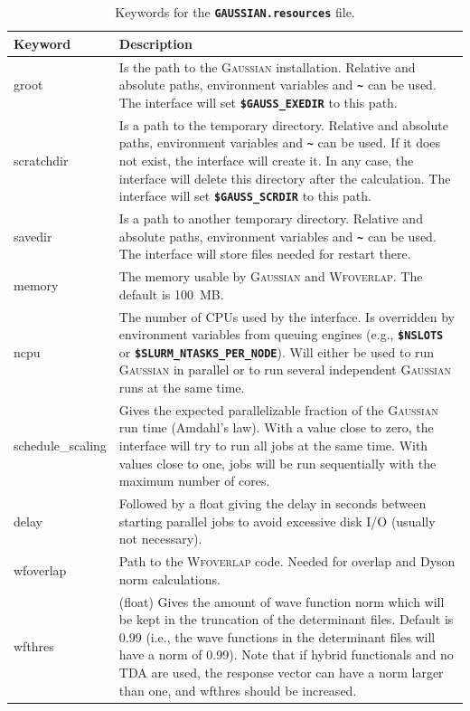 \documentclass[a4paper,10pt,DIV=15,openany,twoside=false]{scrbook}
\newcommand{\ttt}[1]{\textbf{\texttt{#1}}}
\begin{document}
\begin{table}
  \centering
  \caption{Keywords for the \ttt{GAUSSIAN.resources} file.}
  \label{tab:adf_sh2}
  \begin{tabular}{>{\ttfamily}lp{12cm}}
  \toprule
  Keyword       &Description\\
  \midrule
groot                   &Is the path to the \textsc{Gaussian} installation. Relative and absolute paths, environment variables and \ttt{\textasciitilde} can be used. The interface will set \ttt{\$GAUSS\_EXEDIR} to this path.
\\
scratchdir              &Is a path to the temporary directory. Relative and absolute paths, environment variables and \ttt{\textasciitilde} can be used. If it does not exist, the interface will create it. In any case, the interface will delete this directory after the calculation. The interface will set \ttt{\$GAUSS\_SCRDIR} to this path.
\\
savedir                 &Is a path to another temporary directory.  Relative and absolute paths, environment variables and \ttt{\textasciitilde} can be used. The interface will store files needed for restart there.
\\
memory                  &The memory usable by \textsc{Gaussian} and \textsc{Wfoverlap}. The default is 100~MB. 
\\
ncpu                    &The number of CPUs used by the interface. Is overridden by environment variables from queuing engines (e.g., \ttt{\$NSLOTS} or \ttt{\$SLURM\_NTASKS\_PER\_NODE}). Will either be used to run \textsc{Gaussian} in parallel or to run several independent \textsc{Gaussian} runs at the same time.
\\
schedule\_scaling       &Gives the expected parallelizable fraction of the \textsc{Gaussian} run time (Amdahl's law). With a value close to zero, the interface will try to run all jobs at the same time. With values close to one, jobs will be run sequentially with the maximum number of cores.
\\
delay                   &Followed by a float giving the delay in seconds between starting parallel jobs to avoid excessive disk I/O (usually not necessary).
\\
wfoverlap               &Path to the \textsc{Wfoverlap} code. Needed for overlap and Dyson norm calculations.
\\
wfthres                 &(float) Gives the amount of wave function norm which will be kept in the truncation of the determinant files. Default is 0.99 (i.e., the wave functions in the determinant files will have a norm of 0.99). Note that if hybrid functionals and no TDA are used, the response vector can have a norm larger than one, and wfthres should be increased.

\end{tabular}
\end{table}
\end{document}
